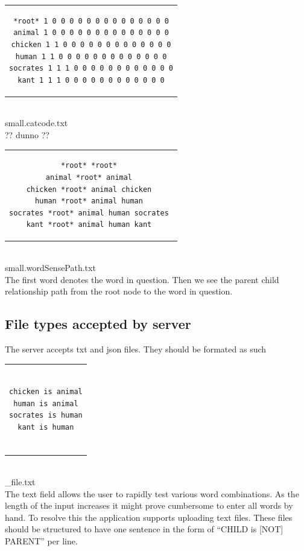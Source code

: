\documentclass[]{article}
\begin{document}
\begin{tabular}{c}
\begin{lstlisting}
*root* 1 0 0 0 0 0 0 0 0 0 0 0 0 0 0
animal 1 0 0 0 0 0 0 0 0 0 0 0 0 0 0
chicken 1 1 0 0 0 0 0 0 0 0 0 0 0 0 0
human 1 1 0 0 0 0 0 0 0 0 0 0 0 0 0
socrates 1 1 1 0 0 0 0 0 0 0 0 0 0 0 0
kant 1 1 1 0 0 0 0 0 0 0 0 0 0 0 0
\end{lstlisting}
\end{tabular}
\\small.catcode.txt
\\ ?? dunno ??


\begin{tabular}{c}
\begin{lstlisting}
*root* *root* 
animal *root* animal 
chicken *root* animal chicken 
human *root* animal human 
socrates *root* animal human socrates 
kant *root* animal human kant 

\end{lstlisting}
\end{tabular}
\\small.wordSensePath.txt
\\The first word denotes the word in question. Then we see the parent child relationship path from the root node to the word in question.



\subsection{File types accepted by server}
The server accepts txt and json files. They should be formated as such

\begin{center}
\begin{tabular}{c}
\begin{lstlisting}

chicken is animal
human is animal
socrates is human
kant is human


\end{lstlisting}
\end{tabular}
\\_file.txt
\\The text field allows the user to rapidly test various word combinations. As the length of the input increases it might prove cumbersome to enter all words by hand. To resolve this the application supports uploading text files. These files should be structured to have one sentence in the form of “CHILD is [NOT] PARENT” per line.
\end{center}
\end{document}
